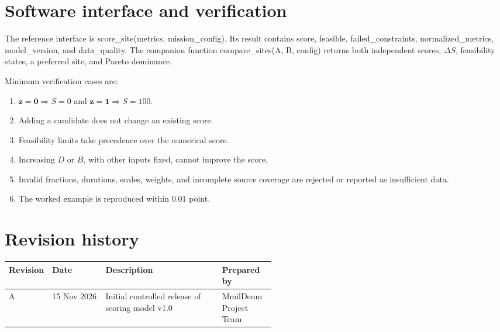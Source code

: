 \documentclass[10pt,a4paper]{article}
\newcommand{\code}[1]{{\ttfamily\small #1}}
\begin{document}
\newpage

\appendix
\section{Software interface and verification}
The reference interface is \code{score\_site(metrics, mission\_config)}. Its result contains \code{score}, \code{feasible}, \code{failed\_constraints}, \code{normalized\_metrics}, \code{model\_version}, and \code{data\_quality}. The companion function \code{compare\_sites(A, B, config)} returns both independent scores, $\Delta S$, feasibility states, a preferred site, and Pareto dominance.

Minimum verification cases are:
\begin{enumerate}
\item $\boldsymbol{z}=\boldsymbol{0}\Rightarrow S=0$ and $\boldsymbol{z}=\boldsymbol{1}\Rightarrow S=100$.
\item Adding a candidate does not change an existing score.
\item Feasibility limits take precedence over the numerical score.
\item Increasing $D$ or $B$, with other inputs fixed, cannot improve the score.
\item Invalid fractions, durations, scales, weights, and incomplete source coverage are rejected or reported as insufficient data.
\item The worked example is reproduced within $0.01$ point.
\end{enumerate}

\section*{Revision history}
\small
\begin{tabularx}{\linewidth}{@{}L{0.13\linewidth}L{0.20\linewidth}Y L{0.20\linewidth}@{}}
\toprule
\textbf{Revision} & \textbf{Date} & \textbf{Description} & \textbf{Prepared by}\\
\midrule
A & 15 Nov 2026 & Initial controlled release of scoring model v1.0 & MmilDeum Project Team\\
\bottomrule
\end{tabularx}
\normalsize
\end{document}
